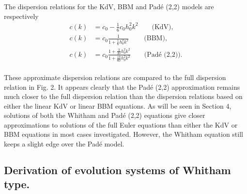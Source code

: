 The dispersion relations for the KdV, BBM and Pad\'e (2,2) models are respectively
\begin{align*}
c(k) & = c_0 - \frac{1}{6} c_0 h_0^2 k^2 \qquad \mbox{(KdV)}, \\
c(k) & = c_0 \frac{1}{1 + \frac{1}{6} h_0^2 k^2} \qquad ~\mbox{(BBM)}, \\
c(k) & = c_0 \frac{1 + \frac{3}{20} h_0^2 k^2}{1 + \frac{19}{60} h_0^2 k^2} \qquad \mbox{(Pad\'e (2,2))}. \\
\label{dispersive-relations}
\end{align*}

These approximate dispersion relations are compared to the full
dispersion relation in Fig. 2. It appears clearly that the Pad\'e (2,2)
approximation remains much closer to the full dispersion relation than the dispersion relations based on either the linear KdV
or linear BBM equations. As will be seen in Section 4, solutions of
both the Whitham and Pad\'e (2,2) equations give closer approximations to solutions of the full Euler equations than either the KdV or
BBM equations in most cases investigated. However, the Whitham
equation still keeps a slight edge over the Pad\'e model.

\subsection{Derivation of evolution systems of Whitham type.}

